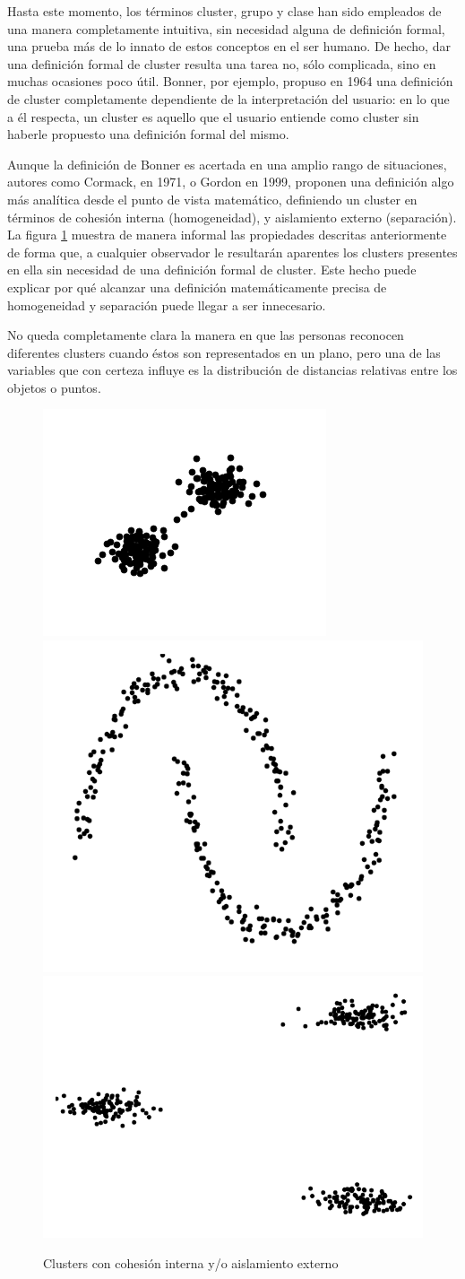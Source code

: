 Hasta este momento, los términos cluster, grupo y clase han sido empleados de una manera completamente intuitiva, sin necesidad alguna de definición formal, una prueba más de lo innato de estos conceptos en el ser humano. De hecho, dar una definición formal de cluster resulta una tarea no, sólo complicada, sino en muchas ocasiones poco útil. Bonner, por ejemplo, propuso en 1964 una definición de cluster completamente dependiente de la interpretación del usuario: en lo que a él respecta, un cluster es aquello que el usuario entiende como cluster sin haberle propuesto una definición formal del mismo.

Aunque la definición de Bonner es acertada en una amplio rango de situaciones, autores como Cormack, en 1971, o Gordon en 1999, proponen una definición algo más analítica desde el punto de vista matemático, definiendo un cluster en términos de cohesión interna (homogeneidad), y aislamiento externo (separación). La figura \ref{fig:figure1} muestra de manera informal las propiedades descritas anteriormente de forma que, a cualquier observador le resultarán aparentes los clusters presentes en ella sin necesidad de una definición formal de cluster. Este hecho puede explicar por qué alcanzar una definición matemáticamente precisa de homogeneidad y separación puede llegar a ser innecesario.

No queda completamente clara la manera en que las personas reconocen diferentes clusters cuando éstos son representados en un plano, pero una de las variables que con certeza influye es la distribución de distancias relativas entre los objetos o puntos.

\clearpage

\begin{figure}[bth]
	\myfloatalign
	{\includegraphics[width=.3\linewidth]{imagenes/c2/TwoBasicsClusters}}
	{\includegraphics[width=.3\linewidth]{imagenes/c2/MoonsBasics}}
	{\includegraphics[width=.3\linewidth]{imagenes/c2/ThreeBasicClusters}}
	\caption[Clusters con cohesión interna y/o aislamiento externo]{Clusters con cohesión interna y/o aislamiento externo}\label{fig:figure1}
\end{figure}

